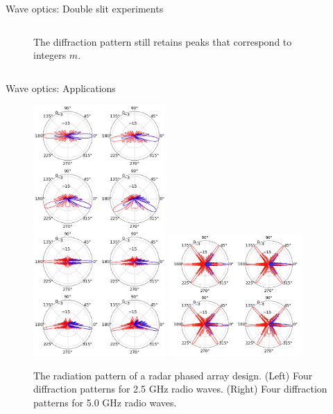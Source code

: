 \documentclass{beamer}
\begin{document}
\begin{frame}{Wave optics: Double slit experiments}
\begin{columns}[T]
\begin{column}{0.5\textwidth}
\begin{figure}
\caption{\label{fig:slit7} \footnotesize The diffraction pattern still retains peaks that correspond to integers $m$.}
\end{figure}
\end{column}
\end{columns}
\end{frame}

\begin{frame}{Wave optics: Applications}
\begin{figure}
\centering
\includegraphics[width=0.45\textwidth,trim=0cm 70cm 0cm 0cm,clip=true]{figures/grating.png}
\includegraphics[width=0.45\textwidth]{figures/grating2.png}
\caption{\label{fig:grating} \footnotesize The radiation pattern of a radar phased array design. (Left) Four diffraction patterns for 2.5 GHz radio waves.  (Right) Four diffraction patterns for 5.0 GHz radio waves.}
\end{figure}
\end{frame}
\end{document}
